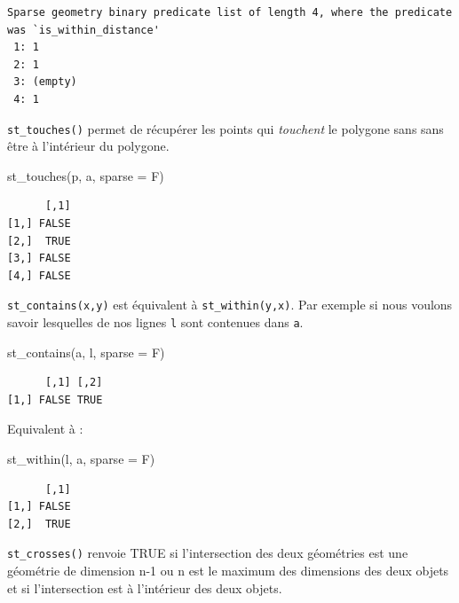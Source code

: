 \documentclass[
]{book}
\newenvironment{Shaded}{\begin{snugshade}}{\end{snugshade}}
\newcommand{\AttributeTok}[1]{\textcolor[rgb]{0.77,0.63,0.00}{#1}}
\newcommand{\FunctionTok}[1]{\textcolor[rgb]{0.00,0.00,0.00}{#1}}
\newcommand{\NormalTok}[1]{#1}
\begin{document}
\begin{verbatim}
Sparse geometry binary predicate list of length 4, where the predicate
was `is_within_distance'
 1: 1
 2: 1
 3: (empty)
 4: 1
\end{verbatim}

\texttt{st\_touches()} permet de récupérer les points qui \emph{touchent} le polygone sans sans être à l'intérieur du polygone.

\begin{Shaded}
\begin{Highlighting}[]
\FunctionTok{st\_touches}\NormalTok{(p, a, }\AttributeTok{sparse =}\NormalTok{ F)}
\end{Highlighting}
\end{Shaded}

\begin{verbatim}
      [,1]
[1,] FALSE
[2,]  TRUE
[3,] FALSE
[4,] FALSE
\end{verbatim}

\texttt{st\_contains(x,y)} est équivalent à \texttt{st\_within(y,x)}. Par exemple si nous voulons savoir lesquelles de nos lignes \texttt{l} sont contenues dans \texttt{a}.

\begin{Shaded}
\begin{Highlighting}[]
\FunctionTok{st\_contains}\NormalTok{(a, l, }\AttributeTok{sparse =}\NormalTok{ F)}
\end{Highlighting}
\end{Shaded}

\begin{verbatim}
      [,1] [,2]
[1,] FALSE TRUE
\end{verbatim}

Equivalent à :

\begin{Shaded}
\begin{Highlighting}[]
\FunctionTok{st\_within}\NormalTok{(l, a, }\AttributeTok{sparse =}\NormalTok{ F)}
\end{Highlighting}
\end{Shaded}

\begin{verbatim}
      [,1]
[1,] FALSE
[2,]  TRUE
\end{verbatim}

\texttt{st\_crosses()} renvoie TRUE si l'intersection des deux géométries est une géométrie de dimension n-1 ou n est le maximum des dimensions des deux objets et si l'intersection est à l'intérieur des deux objets.
\end{document}
